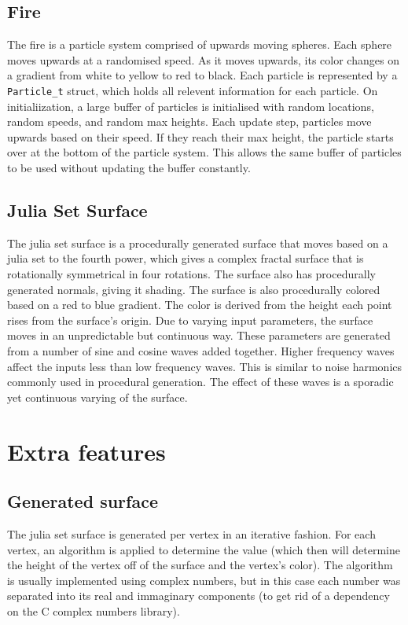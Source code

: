 \documentclass[10pt]{article}
\begin{document}
    \subsection{Fire}
    The fire is a particle system comprised of upwards moving spheres. Each sphere moves upwards at a randomised speed. As it moves upwards, its color changes on a gradient from white to yellow to red to black. Each particle is represented by a \verb|Particle_t| struct, which holds all relevent information for each particle. On initialiization, a large buffer of particles is initialised with random locations, random speeds, and random max heights. Each update step, particles move upwards based on their speed. If they reach their max height, the particle starts over at the bottom of the particle system. This allows the same buffer of particles to be used without updating the buffer constantly.

    \subsection{Julia Set Surface}
    The julia set surface is a procedurally generated surface that moves based on a julia set to the fourth power, which gives a complex fractal surface that is rotationally symmetrical in four rotations. The surface also has procedurally generated normals, giving it shading. The surface is also procedurally colored based on a red to blue gradient. The color is derived from the height each point rises from the surface's origin. Due to varying input parameters, the surface moves in an unpredictable but continuous way. These parameters are generated from a number of sine and cosine waves added together. Higher frequency waves affect the inputs less than low frequency waves. This is similar to noise harmonics commonly used in procedural generation. The effect of these waves is a sporadic yet continuous varying of the surface.
\section{Extra features}
    \subsection{Generated surface}
    The julia set surface is generated per vertex in an iterative fashion. For each vertex, an algorithm is applied to determine the value (which then will determine the height of the vertex off of the surface and the vertex's color). The algorithm is usually implemented using complex numbers, but in this case each number was separated into its real and immaginary components (to get rid of a dependency on the C complex numbers library).
\end{document}

